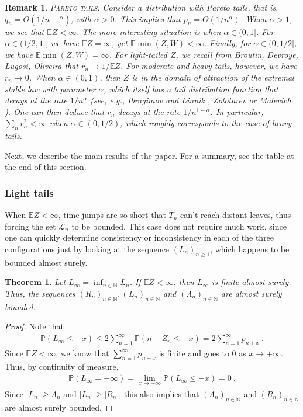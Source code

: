 \documentclass[12pt]{article}
\newcommand{\N}{\mathbb{N}}
\newcommand{\E}{\mathbb{E}}
\newtheorem{theorem}{Theorem}
\newtheorem{remark}{Remark}
\numberwithin{equation}{section} \font\titre=cmbx12
\newcommand{\prob}[1]{\mathbb{P}\left( #1 \right)}
\newcommand{\Lset}{\mathcal{L}} %
\newcommand{\leftmost}{L}
\newcommand{\rightmost}{R}
\newcommand{\leaves}{\Lambda}
\begin{document}
\begin{remark}\label{pareto}
\textsc{Pareto tails.}
Consider a distribution with Pareto tails, that is, $q_n = \Theta (1/n^{1+\alpha})$, with $\alpha > 0$. This implies that $p_n = \Theta(1/n^\alpha)$. When $\alpha > 1$, we see that $\E Z < \infty$.
The more interesting situation is when $\alpha \in (0,1]$. For $\alpha \in (1/2,1]$, we have $\E Z = \infty$, yet $\E \min (Z,W) < \infty$.
Finally, for $\alpha \in (0,1/2]$, we have $\E \min(Z,W) = \infty$.
For light-tailed $Z$, we recall from Broutin, Devroye, Lugosi, Oliveira \cite{surf} that $r_n \to 1/\E Z$. For moderate and heavy tails,
however, we have $r_n \to 0$. When $\alpha \in (0,1)$, then $Z$ is in the domain
of attraction of the extremal stable law with parameter $\alpha$, which itself
has a tail distribution function that decays at the rate $1/n^\alpha$ (see, e.g., Ibragimov and Linnik \cite{ibragimov}, Zolotarev \cite{zolotarev} or Malevich \cite{malevich2015}). One can then deduce that $r_n$ decays at the rate 
$1/n^{1-\alpha}$. In particular, $\sum_n r_n^2 < \infty$ when $\alpha \in (0,1/2)$, which roughly corresponds to the case of heavy tails.
\end{remark}

Next, we describe the main results of the paper. 
For a summary, see the table at the end of this section.  
  
\subsubsection*{Light tails}
When $\E Z < \infty$, time jumps are so short that $T_n$ can't reach distant leaves, thus forcing the set $\Lset_n$ to be bounded.
This case does not require much work, since one can quickly determine consistency or inconsistency in each of the three configurations just by looking at the sequence $(\leftmost_n)_{n\ge 1}$, which happens to be bounded almost surely.

\begin{theorem}\label{M bounded as}
Let $\leftmost_\infty=\inf_{n\in \N} \leftmost_n$. If $\E Z < \infty$, then $\leftmost_\infty$ is finite almost surely.
Thus, the sequences $(\rightmost_n)_{n\in\N},(\leftmost_n)_{n\in\N}$ and $(\leaves_n)_{n\in\N}$ are almost surely bounded.
\end{theorem}

\begin{proof}
Note that
\begin{align*}
    \prob{\leftmost_\infty \le -x} \le 2\sum_{n=1}^{\infty}\prob{n-Z_n\le -x}=2\sum_{n=1}^\infty p_{n+x}~.
\end{align*}
Since $\E Z < \infty $, we know that $\sum_{n=1}^\infty p_{n+x}$ is finite and goes to $0$ as $x\rightarrow +\infty$. Thus, by continuity of measure,
\begin{align*}
    \prob{\leftmost_\infty = -\infty} = \lim_{x\rightarrow +\infty} \prob{\leftmost_\infty \le -x}=0~.
\end{align*}
Since $|\leftmost_n|\ge \leaves_n$ and $|\leftmost_n|\ge |\rightmost_n|$, this also implies that $(\leaves_n)_{n\in \N}$ and $(\rightmost_n)_{n\in\N}$ are almost surely bounded.
\end{proof}
\end{document}
